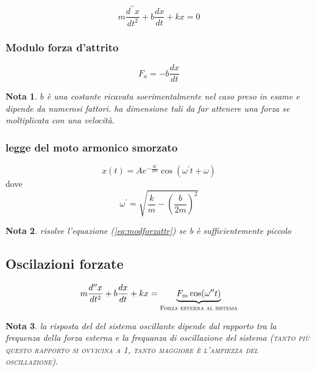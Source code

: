 \documentclass{book}
\newtheorem{nota}{Nota}[section]
\begin{document}
\begin{multicols}{2}
  \begin{equation}
    \label{eq:motarmsmorz}
    m\frac{d^{\prime\prime}x}{dt^2}+b\frac{dx}{dt}+kx=0
  \end{equation}
  
  \subsubsection{Modulo forza d'attrito}
  \label{sec:modforzattr}
  \begin{equation}
    \label{eq:modforzattr}
    F_a=-b\frac{dx}{dt}
  \end{equation}
\end{multicols}
\begin{nota}
  $b$ è una costante ricavata soerimentalmente nel caso preso in esame e dipende da numerosi fattori. ha dimensione tali da far attenere una forza se moltiplicata con una velocità.
\end{nota}

\subsubsection{legge del moto armonico smorzato}
\label{sec:leggdelmotarmsmorz}

\begin{equation}
  \label{eq:leggdelmotarmsmorz}
  x(t)=Ae^{-\frac{bt}{2m}}\cos(\omega^\prime t+\omega)
\end{equation}
dove
\begin{equation*}
  \omega^\prime = \sqrt{\frac{k}{m} - \left(\frac{b}{2m}\right)^2}
\end{equation*}
\begin{nota}
  risolve l'equazione (\ref{eq:modforzattr}) se b è sufficientemente piccolo
\end{nota}

\subsection{Oscilazioni forzate}
\label{sec:oscillaforz}
\begin{equation}
  \label{eq:oscillaforz}
  m\frac{d^{\prime\prime}x}{dt^2}+b\frac{dx}{dt}+kx=\underbrace{F_m\cos(\omega^{\prime\prime}t)}_{\textsc{Forza esterna al sistema}}
\end{equation}
\begin{nota}
  la risposta del del sistema oscillante dipende dal rapporto tra la frequenza della forza esterna e la frequanza di oscillazione del sistema (\textsc{tanto più questo rapporto si ovvicina a 1, tanto maggiore è l'ampiezza del oscillazione}).
\end{nota}
\end{document}
